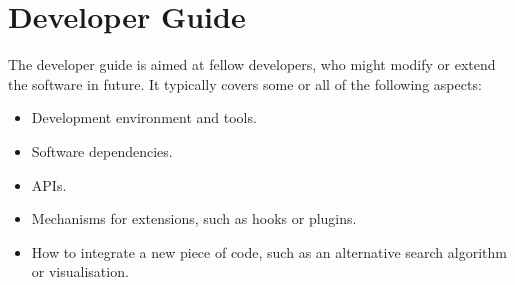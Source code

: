 %
%
% 
% 
% 


\chapter{Developer Guide}
\label{app:DeveloperGuide}

The developer guide is aimed at fellow developers, who might modify or
extend the software in future. It typically covers some or all of the
following aspects:
\begin{itemize}
\item Development environment and tools.

\item Software dependencies.

\item APIs.

\item Mechanisms for extensions, such as hooks or plugins.

\item How to integrate a new piece of code, such as an
  alternative search algorithm or visualisation.
\end{itemize}



